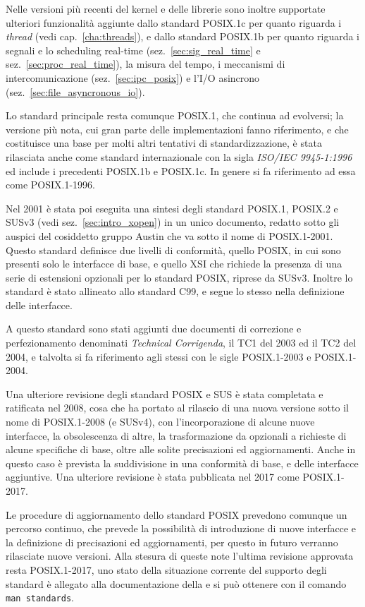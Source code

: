 Nelle versioni più recenti del kernel e delle librerie sono inoltre supportate
ulteriori funzionalità aggiunte dallo standard POSIX.1c per quanto riguarda i
\textit{thread} (vedi cap.~\ref{cha:threads}), e dallo standard POSIX.1b per
quanto riguarda i segnali e lo scheduling real-time
(sez.~\ref{sec:sig_real_time} e sez.~\ref{sec:proc_real_time}), la misura del
tempo, i meccanismi di intercomunicazione (sez.~\ref{sec:ipc_posix}) e l'I/O
asincrono (sez.~\ref{sec:file_asyncronous_io}).

Lo standard principale resta comunque POSIX.1, che continua ad evolversi; la
versione più nota, cui gran parte delle implementazioni fanno riferimento, e
che costituisce una base per molti altri tentativi di standardizzazione, è
stata rilasciata anche come standard internazionale con la sigla
\textsl{ISO/IEC 9945-1:1996} ed include i precedenti POSIX.1b e POSIX.1c. In
genere si fa riferimento ad essa come POSIX.1-1996.

Nel 2001 è stata poi eseguita una sintesi degli standard POSIX.1, POSIX.2 e
SUSv3 (vedi sez.~\ref{sec:intro_xopen}) in un unico documento, redatto sotto
gli auspici del cosiddetto gruppo Austin che va sotto il nome di POSIX.1-2001.
Questo standard definisce due livelli di conformità, quello POSIX, in cui sono
presenti solo le interfacce di base, e quello XSI che richiede la presenza di
una serie di estensioni opzionali per lo standard POSIX, riprese da SUSv3.
Inoltre lo standard è stato allineato allo standard C99, e segue lo stesso
nella definizione delle interfacce.

A questo standard sono stati aggiunti due documenti di correzione e
perfezionamento denominati \textit{Technical Corrigenda}, il TC1 del 2003 ed
il TC2 del 2004, e talvolta si fa riferimento agli stessi con le sigle
POSIX.1-2003 e POSIX.1-2004. 

Una ulteriore revisione degli standard POSIX e SUS è stata completata e
ratificata nel 2008, cosa che ha portato al rilascio di una nuova versione
sotto il nome di POSIX.1-2008 (e SUSv4), con l'incorporazione di alcune nuove
interfacce, la obsolescenza di altre, la trasformazione da opzionali a
richieste di alcune specifiche di base, oltre alle solite precisazioni ed
aggiornamenti. Anche in questo caso è prevista la suddivisione in una
conformità di base, e delle interfacce aggiuntive. Una ulteriore revisione è
stata pubblicata nel 2017 come POSIX.1-2017.

Le procedure di aggiornamento dello standard POSIX prevedono comunque un
percorso continuo, che prevede la possibilità di introduzione di nuove
interfacce e la definizione di precisazioni ed aggiornamenti, per questo in
futuro verranno rilasciate nuove versioni. Alla stesura di queste note
l'ultima revisione approvata resta POSIX.1-2017, uno stato della situazione
corrente del supporto degli standard è allegato alla documentazione della
 e si può ottenere con il comando \texttt{man standards}.


